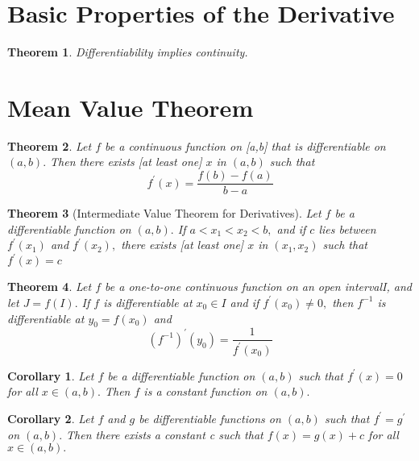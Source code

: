 \documentclass[12pt]{article}
\newtheorem{theorem}{Theorem}[section]
\newtheorem{corollary}{Corollary}[theorem]
\begin{document}
\section{Basic Properties of the Derivative}
\begin{theorem}
	Differentiability implies continuity.
\end{theorem}

\section{Mean Value Theorem}
\begin{theorem}
	Let $f$ be a continuous function on [a,b] that is differentiable on $( a , b ) .$
	Then there exists [at least one] $x$ in $( a , b )$ such that $$
	f ^ { \prime } ( x ) = \frac { f ( b ) - f ( a ) } { b - a }
	$$
\end{theorem}
\begin{theorem}[Intermediate Value Theorem for Derivatives]
	Let $f$ be a differentiable function on $( a , b ) .$ If $a < x _ { 1 } < x _ { 2 } < b ,$ and if $c$ lies between $f ^ { \prime } \left( x _ { 1 } \right)$ and $f ^ { \prime } \left( x _ { 2 } \right) ,$ there exists [at least one] $x$ in
	$\left( x _ { 1 } , x _ { 2 } \right)$ such that $f ^ { \prime } ( x ) = c$
\end{theorem}

\begin{theorem}
	Let $f$ be a one-to-one continuous function on an open intervalI, and
	let $J = f ( I ) .$ If $f$ is differentiable at $x _ { 0 } \in I$ and if $f ^ { \prime } \left( x _ { 0 } \right) \neq 0 ,$ then
	$f ^ { - 1 }$ is differentiable at $y _ { 0 } = f \left( x _ { 0 } \right)$ and 
	$$
	\left( f ^ { - 1 } \right) ^ { \prime } \left( y _ { 0 } \right) = \frac { 1 } { f ^ { \prime } \left( x _ { 0 } \right) }
	$$
\end{theorem}

\begin{corollary}
	Let $f$ be a differentiable function on $( a , b )$ such that $f ^ { \prime } ( x ) = 0$ for all
	$x \in ( a , b ) .$ Then $f$ is a constant function on $( a , b ) .$
\end{corollary}

\begin{corollary}
	Let $f$ and $g$ be differentiable functions on $( a , b )$ such that $f ^ { \prime } = g ^ { \prime }$ on
	$( a , b ) .$ Then there exists a constant c such that $f ( x ) = g ( x ) + c$ for
	all $x \in ( a , b ) .$
\end{corollary}
\end{document}
